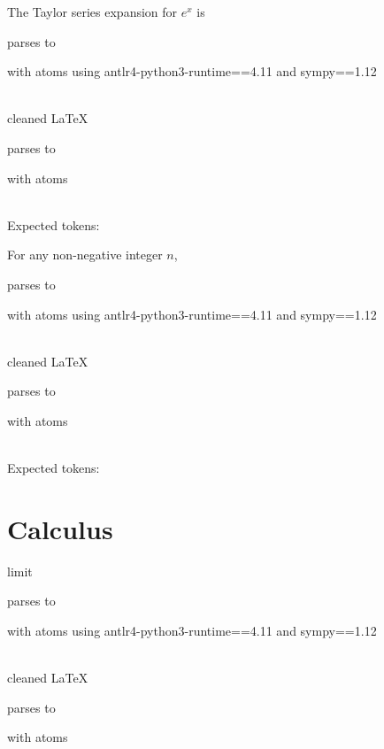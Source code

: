\documentclass{article}
\begin{document}
The Taylor series expansion for $e^x$ is 

parses to

with atoms
using antlr4-python3-runtime==4.11 and sympy==1.12

\ \\
cleaned \LaTeX

parses to

with atoms


\ \\
Expected tokens:



\hrulefill


For any non-negative integer $n$,

parses to

with atoms
using antlr4-python3-runtime==4.11 and sympy==1.12

\ \\
cleaned \LaTeX

parses to

with atoms


\ \\
Expected tokens:


\hrulefill


\section{Calculus}
limit

parses to

with atoms
using antlr4-python3-runtime==4.11 and sympy==1.12

\ \\
cleaned \LaTeX

parses to

with atoms

\end{document}

